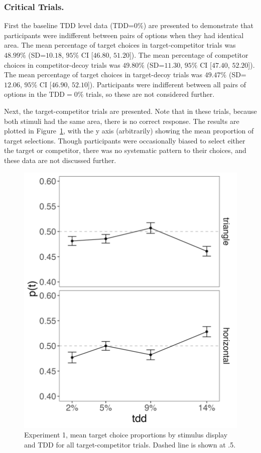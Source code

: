 \subsubsection{Critical Trials.}
First the baseline TDD level data (TDD=$0\%$) are presented to demonstrate that participants were indifferent between pairs of options when they had identical area. The mean percentage of target choices in target-competitor trials was $48.99\%$ (SD=$10.18$, $95\%$ CI [$46.80$, $51.20$]). The mean percentage of competitor choices in competitor-decoy trials was $49.80\%$ (SD=$11.30$, $95\%$ CI [$47.40$, $52.20$]). The mean percentage of target choices in target-decoy trials was $49.47\%$ (SD=$12.06$, $95\%$ CI [$46.90$, $52.10$]). Participants were indifferent between all pairs of options in the $\text{TDD}=0\%$ trials, so these are not considered further.

Next, the target-competitor trials are presented. Note that in these trials, because both stimuli had the same area, there is no correct response. The results are plotted in Figure~\ref{fig:e1_tc}, with the y axis (arbitrarily) showing the mean proportion of target selections. Though participants were occasionally biased to select either the target or competitor, there was no systematic pattern to their choices, and these data are not discussed further.

\begin{figure}
   \includegraphics[width=\textwidth]{figures/2afc_tc_choices.jpeg}
   \caption{Experiment 1, mean target choice proportions by stimulus display and TDD for all target-competitor trials. Dashed line is shown at .5.}
   \label{fig:e1_tc}
\end{figure}

